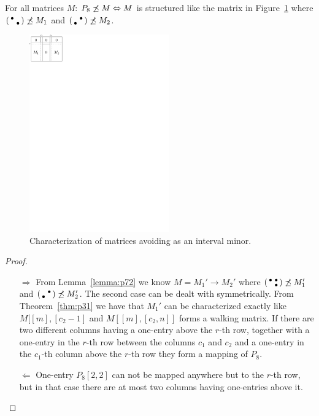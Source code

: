 \begin{thm}
For all matrices $M$: $P_8\not\preceq M\Leftrightarrow M$ is structured like the matrix in Figure~\ref{fig:p72} where $\left(\begin{smallmatrix}\bullet& \\ &\bullet\end{smallmatrix}\right)\not\preceq M_1$ and $\left(\begin{smallmatrix} &\bullet\\\bullet& \end{smallmatrix}\right)\not\preceq M_2$.
\end{thm}
\begin{figure}[!ht]
\centering
\includegraphics[width=60mm]{img/p72.pdf}
\caption{Characterization of matrices avoiding \usebox{\smlmatc} as an interval minor.}
\label{fig:p72}
\end{figure}
\begin{proof}
\begin{itemize}
	\item[$\Rightarrow$] From Lemma~\ref{lemma:p72} we know $M=M_1'\rightarrow M_2'$ where $\left(\begin{smallmatrix}\bullet&\bullet\\ &\bullet\end{smallmatrix}\right)\not\preceq M_1'$ and $\left(\begin{smallmatrix} &\bullet\\\bullet& \end{smallmatrix}\right)\not\preceq M_2'$. The second case can be dealt with symmetrically. From Theorem~\ref{thm:p31} we have that $M_1'$ can be characterized exactly like $M[[m],[c_2-1]$ and $M[[m],[c_2,n]]$ forms a walking matrix. If there are two different columns having a one-entry above the $r$-th row, together with a one-entry in the $r$-th row between the columns $c_1$ and $c_2$ and a one-entry in the $c_1$-th column above the $r$-th row they form a mapping of $P_8$.
	\item[$\Leftarrow$] One-entry $P_8[2,2]$ can not be mapped anywhere but to the $r$-th row, but in that case there are at most two columns having one-entries above it.
\end{itemize}
\end{proof}

